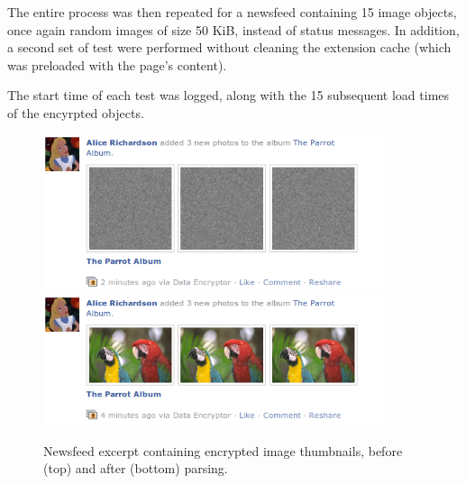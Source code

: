 The entire process was then repeated for a newsfeed containing 15 image objects, once again random images of size 50 KiB, instead of status messages. In addition, a second set of test were performed without cleaning the extension cache (which was preloaded with the page's content).

The start time of each test was logged, along with the 15 subsequent load times of the encyrpted objects. 

    \begin{figure}[tbph]
        \begin{center}
                \includegraphics[width=10cm]{screens/parrots1.png}
                \includegraphics[width=10cm]{screens/parrots2.png}
            \caption{Newsfeed excerpt containing encrypted image thumbnails, before (top) and after (bottom) parsing.}
            \label{scn:parrots}
        \end{center}
    \end{figure}





